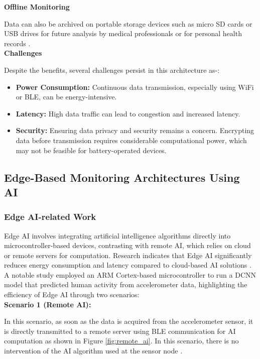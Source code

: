 \noindent\textbf{Offline Monitoring}

\noindent Data can also be archived on portable storage devices such as micro SD cards or USB drives for future analysis by medical professionals or for personal health records \cite{Dias2018Wearable}.\\

\noindent\textbf{Challenges}

\noindent Despite the benefits, several challenges persist in this architecture as\cite{Muhoza2023Power, Lim2010Security}-:

\begin{itemize}
	\item \textbf{Power Consumption:} Continuous data transmission, especially using WiFi or BLE, can be energy-intensive.
	\item \textbf{Latency:} High data traffic can lead to congestion and increased latency.
	\item \textbf{Security:} Ensuring data privacy and security remains a concern. Encrypting data before transmission requires considerable computational power, which may not be feasible for battery-operated devices.
\end{itemize}


\subsection{Edge-Based Monitoring Architectures Using AI}
\vspace{1em}
\subsubsection{Edge AI-related Work}

\noindent Edge AI involves integrating artificial intelligence algorithms directly into microcontroller-based devices, contrasting with remote AI, which relies on cloud or remote servers for computation. Research indicates that Edge AI significantly reduces energy consumption and latency compared to cloud-based AI solutions \cite{Muhoza2023, Himeur2024, Vita2020}. A notable study \cite{Muhoza2023} employed an ARM Cortex-based microcontroller to run a DCNN model that predicted human activity from accelerometer data, highlighting the efficiency of Edge AI through two scenarios:\\

\noindent\textbf{Scenario 1 (Remote AI):}

\noindent In this scenario, as soon as the data is acquired from the accelerometer sensor, it is directly transmitted to a remote server using BLE communication for AI computation as shown in Figure \ref{fig:remote_ai}. In this scenario, there is no intervention of the AI algorithm used at the sensor node \cite{Muhoza2023}.

